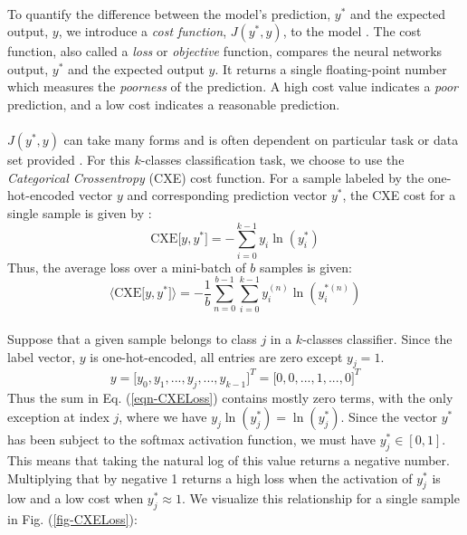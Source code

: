 \documentclass[12pt,letterpaper]{article}
\begin{document}
\paragraph*{}To quantify the difference between the model's prediction, $y^*$ and the expected output, $y$, we introduce a \textit{cost function}, $J(y^*,y)$, to the model \cite{Goodfellow,James}. The cost function, also called a \textit{loss} or \textit{objective} function, compares the neural networks output, $y^*$ and the expected output $y$. It returns a single floating-point number which measures the \textit{poorness} of the prediction. A high cost value indicates a \textit{poor} prediction, and a low cost indicates a reasonable prediction. 

\paragraph*{}$J(y^*,y)$ can take many forms and is often dependent on particular task or data set provided \cite{James}. For this $k$-classes classification task, we choose to use the \textit{Categorical Crossentropy} (CXE) cost function. For a sample labeled by the one-hot-encoded vector $y$ and corresponding prediction vector $y^*$, the CXE cost for a single sample is given by \cite{Goodfellow,Virtanen,Bishop}:
\begin{equation}
\label{eqn-CXELoss}
\text{CXE}\big[ y , y^* \big] = - \sum_{i=0}^{k-1} y_i \ln(y^*_i) 
\end{equation}
Thus, the average loss over a mini-batch of $b$ samples is given:
\begin{equation}
\label{eqn-CXELossAvg}
\big\langle \text{CXE}\big[ y , y^* \big]\big\rangle = 
- \frac{1}{b}\sum_{n=0}^{b-1}\sum_{i=0}^{k-1} y_i^{(n)} \ln(y^{*(n)}_i) 
\end{equation}

\paragraph*{}Suppose that a given sample belongs to class $j$ in a $k$-classes classifier. Since the label vector, $y$ is one-hot-encoded, all entries are zero except $y_{j} = 1$.
\begin{equation}
y = \big[y_0,y_1, ... , y_{j} , ..., y_{k-1} \big]^T  = 
\big[0,0, ... , 1 , ...,0 \big]^T
\end{equation}
Thus the sum in Eq. (\ref{eqn-CXELoss}) contains mostly zero terms, with the only exception at index $j$, where we have $y_j\ln(y^*_j) = \ln(y^*_j)$. Since the vector $y^*$ has been subject to the softmax activation function, we must have $y^*_j \in [0,1]$. This means that taking the natural log of this value returns a negative number. Multiplying that by negative 1 returns a high loss when the activation of $y^*_j$ is low and a low cost when $y^*_j \approx 1$. We visualize this relationship for a single sample in Fig. (\ref{fig-CXELoss}):
\end{document}
